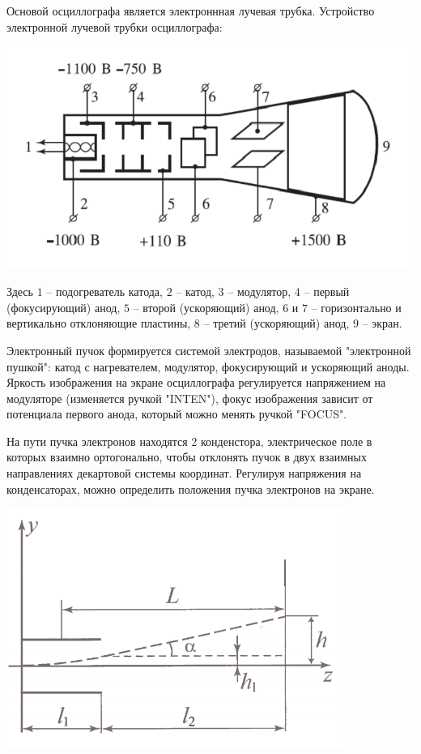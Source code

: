 \documentclass[a4paper, 12pt]{article} %
\begin{document}
Основой осциллографа является электроннная лучевая трубка. Устройство электронной лучевой трубки осциллографа:

\begin{center}
	\includegraphics[width=\textwidth]{1}
\end{center}

Здесь $1$ -- подогреватель катода, $2$ -- катод, $3$ -- модулятор, $4$ -- первый (фокусирующий)
анод, $5$ -- второй (ускоряющий) анод, $6$ и $7$ -- горизонтально и вертикально отклоняющие
пластины, $8$ -- третий (ускоряющий) анод, $9$ -- экран.

Электронный пучок формируется системой электродов, называемой "электронной пушкой": катод с нагревателем, модулятор, фокусирующий и ускоряющий аноды. Яркость изображения на экране осциллографа регулируется напряжением на модуляторе (изменяется ручкой "INTEN"), фокус изображения зависит от потенциала первого анода, который можно менять ручкой "FOCUS".

На пути пучка электронов находятся 2 конденстора, электрическое поле в которых взаимно ортогонально, чтобы отклонять пучок в двух взаимных направлениях декартовой системы координат. Регулируя напряжения на конденсаторах, можно определить положения пучка электронов на экране.

\begin{center}
	\includegraphics[width=11cm]{2}
\end{center}
\end{document}
